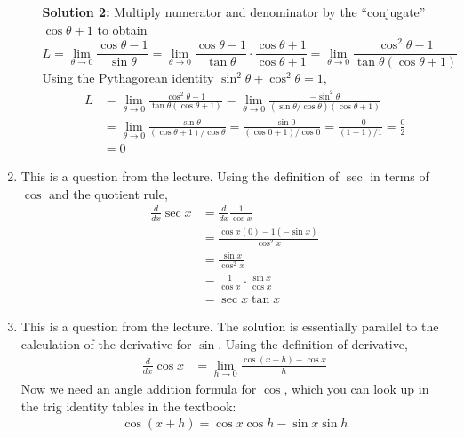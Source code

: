 \documentclass{article}
\begin{document}
\begin{enumerate}
\begin{enumerate}
    \textbf{Solution 2:}  Multiply numerator and denominator by the
    ``conjugate'' $\cos\theta+1$ to obtain
    \begin{equation*}
      L = \lim_{\theta\to 0} \frac{\cos\theta - 1}{\sin\theta}
      = \lim_{\theta\to 0} \frac{\cos\theta - 1}{\tan\theta} 
      \cdot \frac{\cos\theta+1}{\cos\theta+1}
      = \lim_{\theta\to 0} \frac{\cos^2\theta - 1}{\tan\theta(\cos\theta+1)} 
    \end{equation*}
    Using the Pythagorean identity $\sin^2\theta+\cos^2\theta=1$,
    \begin{align*}
      L &= \lim_{\theta\to 0} \frac{\cos^2\theta - 1}{\tan\theta(\cos\theta+1)} 
          = \lim_{\theta\to 0}
          \frac{-\sin^2\theta}{(\sin\theta/\cos\theta)(\cos\theta+1)}
      \\
        &= \lim_{\theta\to 0} \frac{-\sin\theta}{(\cos\theta+1)/\cos\theta}
        = \frac{-\sin 0}{(\cos 0+1)/\cos 0} = \frac{-0}{(1+1)/1} =
        \frac{0}{2}
      \\
        &= 0
    \end{align*}
  \end{enumerate}
\item %
  This is a question from the lecture.  Using the definition of $\sec$
  in terms of $\cos$ and the quotient rule,
  \begin{align*}
    \frac{d}{dx} \sec x &= \frac{d}{dx} \frac{1}{\cos x}
    \\
                        &= \frac{\cos x (0) - 1 (-\sin x)}{\cos^2 x}
    \\
                        &=\frac{\sin x}{\cos^2 x}
    \\
                        &=\frac{1}{\cos x} \cdot \frac{\sin x}{\cos x}
    \\
                        &=\sec x \tan x
  \end{align*}
\item %
  This is a question from the lecture.  The solution is essentially
  parallel to the calculation of the derivative for $\sin$.  Using the
  definition of derivative,
  \begin{align*}
    \frac{d}{dx} \cos x &= \lim_{h\to 0} \frac{\cos(x+h) - \cos x}{h}
  \end{align*}
  Now we need an angle addition formula for $\cos$, which you can look
  up in the trig identity tables in the textbook:
  \begin{align*}
    \cos(x+h) = \cos x \cos h - \sin x \sin h
  \end{align*}

\end{enumerate}
\end{document}
